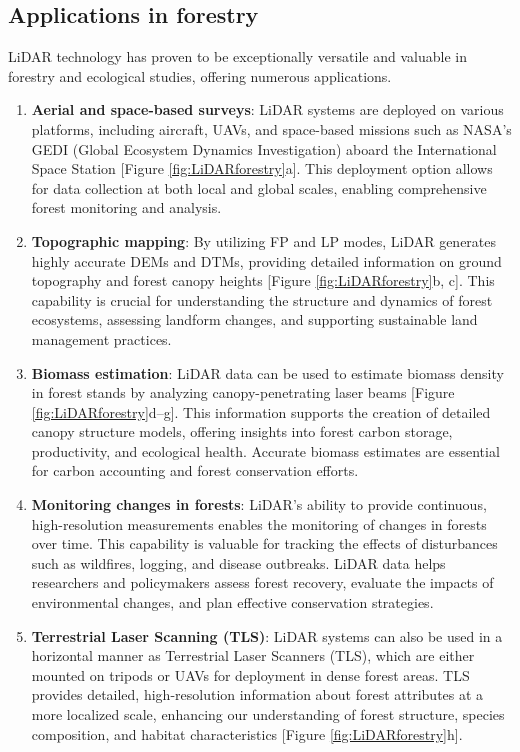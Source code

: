 \documentclass[
  12 pt,
]{Nemilov}
\begin{document}
\subsection{Applications in forestry}\label{applications-in-forestry}

LiDAR technology has proven to be exceptionally versatile and valuable in forestry and ecological studies, offering numerous applications.

\begin{enumerate}
\def\labelenumi{\arabic{enumi}.}
\item
  \textbf{Aerial and space-based surveys}: LiDAR systems are deployed on various platforms, including aircraft, UAVs, and space-based missions such as NASA's GEDI (Global Ecosystem Dynamics Investigation) aboard the International Space Station {[}Figure \ref{fig:LiDARforestry}a{]}. This deployment option allows for data collection at both local and global scales, enabling comprehensive forest monitoring and analysis.
\item
  \textbf{Topographic mapping}: By utilizing FP and LP modes, LiDAR generates highly accurate DEMs and DTMs, providing detailed information on ground topography and forest canopy heights {[}Figure \ref{fig:LiDARforestry}b, c{]}. This capability is crucial for understanding the structure and dynamics of forest ecosystems, assessing landform changes, and supporting sustainable land management practices.
\item
  \textbf{Biomass estimation}: LiDAR data can be used to estimate biomass density in forest stands by analyzing canopy-penetrating laser beams {[}Figure \ref{fig:LiDARforestry}d--g{]}. This information supports the creation of detailed canopy structure models, offering insights into forest carbon storage, productivity, and ecological health. Accurate biomass estimates are essential for carbon accounting and forest conservation efforts.
\item
  \textbf{Monitoring changes in forests}: LiDAR's ability to provide continuous, high-resolution measurements enables the monitoring of changes in forests over time. This capability is valuable for tracking the effects of disturbances such as wildfires, logging, and disease outbreaks. LiDAR data helps researchers and policymakers assess forest recovery, evaluate the impacts of environmental changes, and plan effective conservation strategies.
\item
  \textbf{Terrestrial Laser Scanning (TLS)}: LiDAR systems can also be used in a horizontal manner as Terrestrial Laser Scanners (TLS), which are either mounted on tripods or UAVs for deployment in dense forest areas. TLS provides detailed, high-resolution information about forest attributes at a more localized scale, enhancing our understanding of forest structure, species composition, and habitat characteristics {[}Figure \ref{fig:LiDARforestry}h{]}.
\end{enumerate}
\end{document}
